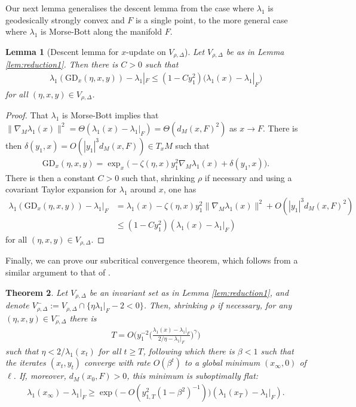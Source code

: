 \documentclass{article}
\newcommand{\GD}{\mathrm{GD}}
\theoremstyle{plain}
\newtheorem{theorem}{Theorem}[section]
\newtheorem{lemma}[theorem]{Lemma}
\theoremstyle{definition}
\theoremstyle{remark}
\begin{document}
Our next lemma generalises the descent lemma \cite[Lemma D.1]{macdonaldeos} from the case where $\lambda_1$ is geodesically strongly convex and $F$ is a single point, to the more general case where $\lambda_1$ is Morse-Bott along the manifold $F$.

\begin{lemma}[Descent lemma for $x$-update on $V_{\rho,\Delta}$]\label{lem:morsebottdescent}
    Let $V_{\rho,\Delta}$ be as in Lemma \ref{lem:reduction1}. Then there is $C>0$ such that
    \begin{align}
    \lambda_1(\GD_x(\eta,x,y))-\lambda_1|_F\leq (1-Cy_1^2)\big(\lambda_1(x)-\lambda_1|_F\big)
    \end{align}
    for all $(\eta,x,y)\in V_{\rho,\Delta}$.
\end{lemma}

\begin{proof}
    That $\lambda_1$ is Morse-Bott implies that $\|\nabla_M\lambda_1(x)\|^2=\Theta(\lambda_1(x)-\lambda_1|_F) = \Theta(d_M(x,F)^2)$ as $x\rightarrow F$. There is then $\delta(y_1,x) = O(|y_1|^3d_M(x,F))\in T_xM$ such that
    \begin{align}
    \GD_x(\eta,x,y) = \exp_x\big(-\zeta(\eta,x)y_1^2\nabla_M\lambda_1(x) + \delta(y_1,x)\big).
    \end{align}
    There is then a constant $C>0$ such that, shrinking $\rho$ if necessary and using a covariant Taylor expansion for $\lambda_1$ around $x$, one has
    \begin{align}
    \lambda_1(\GD_x(\eta,x,y))-\lambda_1|_F&= \lambda_1(x)-\zeta(\eta,x)y_1^2\|\nabla_M\lambda_1(x)\|^2 + O(|y_1|^3d_M(x,F)^2)\\&\leq (1-Cy_1^2)(\lambda_1(x)-\lambda_1|_F)
    \end{align}
    for all $(\eta,x,y)\in V_{\rho,\Delta}$.
\end{proof}

Finally, we can prove our subcritical convergence theorem, which follows from a similar argument to that of \cite[Theorem D.4]{macdonaldeos}.

\begin{theorem}\label{thm:subcritappendix}
    Let $V_{\rho,\Delta}$ be an invariant set as in Lemma \ref{lem:reduction1}, and denote $V^-_{\rho,\Delta}:=V_{\rho,\Delta}\cap\{\eta\lambda_1|_F-2<0\}$. Then, shrinking $\rho$ if necessary, for any $(\eta,x,y)\in V^-_{\rho,\Delta}$ there is
    \begin{align}
    T = O\bigg( y_1^{-2}\bigg(\frac{\lambda_1(x)-\lambda_1|_F}{2/\eta-\lambda_1|_F}\bigg)^{\gamma}\bigg)
    \end{align}
    such that $\eta <2/\lambda_1(x_t)$ for all $t\geq T$, following which there is $\beta<1$ such that the iterates $(x_t,y_t)$ converge with rate $O(\beta^t)$ to a global minimum $(x_{\infty},0)$ of $\ell$. If, moreover, $d_M(x_0,F)>0$, this minimum is suboptimally flat: 
    \begin{align}
    \lambda_1(x_{\infty})-\lambda_1|_F\geq \exp\big(-O(y_{1,T}^2(1-\beta^2)^{-1})\big)(\lambda_1(x_T)-\lambda_1|_F).
    \end{align}
\end{theorem}
\end{document}
